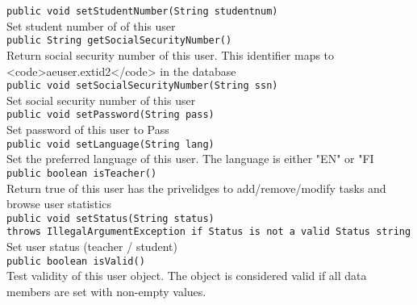 {\tt		public void setStudentNumber(String studentnum)} \\ 
Set student number of of this user\\
	
{\tt		public String getSocialSecurityNumber()} \\ 
Return social security number of this user. This identifier maps to <code>aeuser.extid2</code> in the database\\
	
{\tt		public void setSocialSecurityNumber(String ssn)} \\ 
Set social security number of this user\\
	
{\tt		public void setPassword(String pass)} \\ 
Set password of this user to Pass\\
	
{\tt		public void setLanguage(String lang)} \\ 
Set the preferred language of this user. The language is either "EN" or "FI\\
	
{\tt		public boolean isTeacher()} \\ 
Return true of this user has the privelidges to add/remove/modify tasks and browse user statistics\\

{\tt		public void setStatus(String status)} \\  
{\tt		throws IllegalArgumentException if Status is not a valid Status string}\\
Set user status (teacher / student)\\
	
{\tt		public boolean isValid()} \\
Test validity of this user object. The object is considered valid if all data members are set with non-empty values.\\





